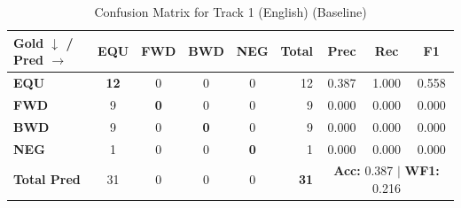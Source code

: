 \begin{table}[ht]
\centering
\small
\begin{tabular}{l|cccc|r|ccc}
\toprule
\textbf{Gold $\downarrow$ / Pred $\rightarrow$} & \textbf{EQU} & \textbf{FWD} & \textbf{BWD} & \textbf{NEG} & \textbf{Total} & \textbf{Prec} & \textbf{Rec} & \textbf{F1} \\
\midrule
\textbf{EQU} & \textbf{12} & 0 & 0 & 0 & 12 & 0.387 & 1.000 & 0.558 \\
\textbf{FWD} & 9 & \textbf{0} & 0 & 0 & 9 & 0.000 & 0.000 & 0.000 \\
\textbf{BWD} & 9 & 0 & \textbf{0} & 0 & 9 & 0.000 & 0.000 & 0.000 \\
\textbf{NEG} & 1 & 0 & 0 & \textbf{0} & 1 & 0.000 & 0.000 & 0.000 \\
\midrule
\textbf{Total Pred} & 31 & 0 & 0 & 0 & \textbf{31} & \multicolumn{3}{c}{\textbf{Acc:} 0.387 $\mid$ \textbf{WF1:} 0.216} \\
\bottomrule
\end{tabular}
\caption{Confusion Matrix for Track 1 (English) (Baseline)}
\label{tab:confusion_matrix}
\end{table}